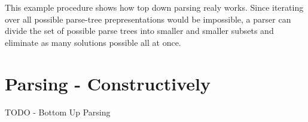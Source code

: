 \documentclass[11pt]{article}
\begin{document}
This example procedure shows how top down parsing realy works. Since iterating over all possible parse-tree prepresentations
would be impossible, a parser can divide the set of possible parse trees into smaller and smaller subsets and eliminate as
many solutions possible all at once.

\section{Parsing - Constructively}
TODO - Bottom Up Parsing

{}

\end{document}
